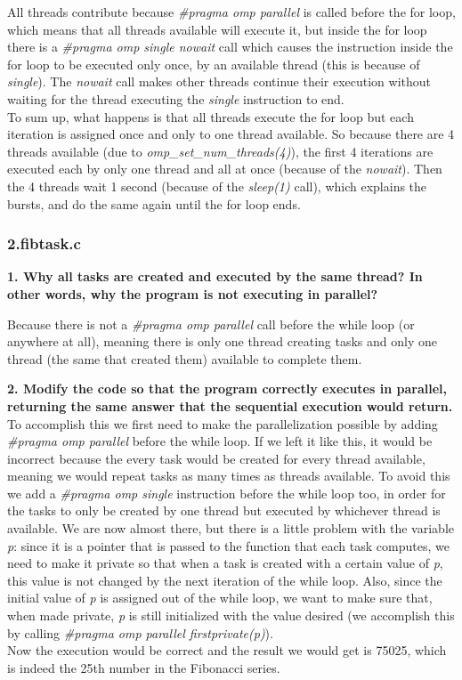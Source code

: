 \documentclass[12]{article}
\begin{document}
All threads contribute because \textit{\#pragma omp parallel} is called before the for loop, which means that all threads available will execute it, but inside the for loop there is a \textit{\#pragma omp single nowait} call which causes the instruction inside the for loop to be executed only once, by an available thread (this is because of \textit{single}). The \textit{nowait} call makes other threads continue their execution without waiting for the thread executing the \textit{single} instruction to end. \\
To sum up, what happens is that all threads execute the for loop but each iteration is assigned once and only to one thread available. So because there are 4 threads available (due to \textit{omp\_set\_num\_threads(4)}), the first 4 iterations are executed each by only one thread and all at once (because of the \textit{nowait}). Then the 4 threads wait 1 second (because of the \textit{sleep(1)} call), which explains the bursts, and do the same again until the for loop ends.

\subsubsection{2.fibtask.c}
\textbf{1. Why all tasks are created and executed by the same thread? In other words, why the program
is not executing in parallel?} 

Because there is not a \textit{\#pragma omp parallel} call before the while loop (or anywhere at all), meaning there is only one thread creating tasks and only one thread (the same that created them) available to complete them. 

\textbf{2. Modify the code so that the program correctly executes in parallel, returning the same answer that the sequential execution would return.}
To accomplish this we first need to make the parallelization possible by adding \textit{\#pragma omp parallel} before the while loop. If we left it like this, it would be incorrect because the every task would be created for every thread available, meaning we would repeat tasks as many times as threads available. To avoid this we add a \textit{\#pragma omp single} instruction before the while loop too, in order for the tasks to only be created by one thread but executed by whichever thread is available. We are now almost there, but there is a little problem with the variable \textit{p}: since it is a pointer that is passed to the function that each task computes, we need to make it private so that when a task is created with a certain value of \textit{p}, this value is not changed by the next iteration of the while loop. Also, since the initial value of \textit{p} is assigned out of the while loop, we want to make sure that, when made private, \textit{p} is still initialized with the value desired (we accomplish this by calling \textit{\#pragma omp parallel firstprivate(p)}). \\
Now the execution would be correct and the result we would get is 75025, which is indeed the 25th number in the Fibonacci series.\\
\medskip
\end{document}
